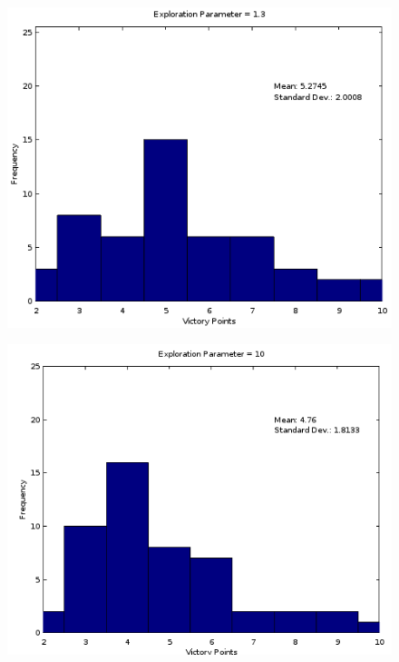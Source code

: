 \documentclass[]{article}
\begin{document}
\begin{center}

\begin{figure}[H]
\centering
\begin{minipage}{.5\textwidth}
  \centering
  \includegraphics[width=.9\linewidth]{figures/exploration1-3}
  \label{fig:explore1.3}
\end{minipage}%
\begin{minipage}{.5\textwidth}
  \centering
  \includegraphics[width=.9\linewidth]{figures/exploration10}
  \label{fig:explore10}
\end{minipage}
\end{figure}


\end{center}
\end{document}
